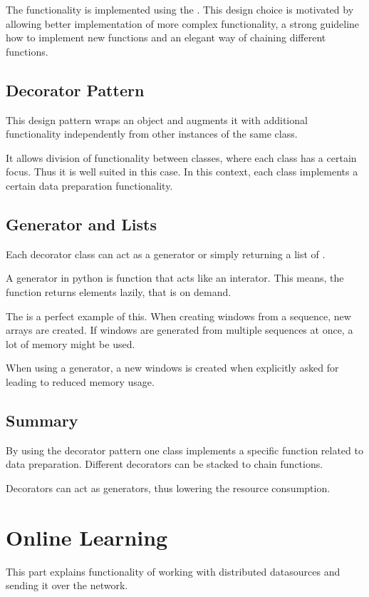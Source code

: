 \documentclass[letterpaper,10pt,english]{sphinxmanual}
\begin{document}
The functionality is implemented using the .
This design choice is motivated by allowing better implementation of more
complex functionality, a strong guideline how to implement new functions and
an elegant way of chaining different functions.


\subsection{Decorator Pattern}
\label{implementation:subsec-decorator-pattern}\label{implementation:decorator-pattern}
This design pattern wraps an object and augments it with additional functionality
independently from other instances of the same class.

It allows division of functionality between classes, where each class has
a certain focus. Thus it is well suited in this case. In this context, each
class implements a certain data preparation functionality.


\subsection{Generator and Lists}
\label{implementation:generator-and-lists}
Each decorator class can act as a generator or simply returning a list of
.

A generator in python is function that acts like an interator. This means,
the function returns elements lazily, that is on demand.

The  is a perfect example of this. When creating windows
from a sequence, new arrays are created. If windows are generated from multiple
sequences at once, a lot of memory might be used.

When using a generator, a new windows is created when explicitly asked for
leading to reduced memory usage.


\subsection{Summary}
\label{implementation:id1}
By using the decorator pattern one class implements a specific function
related to data preparation. Different decorators can be stacked to chain
functions.

Decorators can act as generators, thus lowering the resource consumption.


\section{Online Learning}
\label{implementation:online-learning}
This part explains functionality of working with distributed datasources and
sending it over the network.
\end{document}
